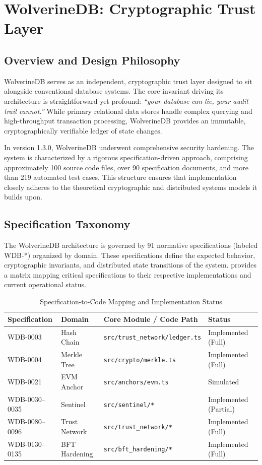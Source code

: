 \chapter{WolverineDB: Cryptographic Trust Layer}\label{ch:wolverinedb}

\section{Overview and Design Philosophy}\label{sec:wdb-overview}
WolverineDB serves as an independent, cryptographic trust layer designed to sit alongside conventional database systems. The core invariant driving its architecture is straightforward yet profound: \textit{``your database can lie, your audit trail cannot.''} While primary relational data stores handle complex querying and high-throughput transaction processing, WolverineDB provides an immutable, cryptographically verifiable ledger of state changes. 

In version 1.3.0, WolverineDB underwent comprehensive security hardening. The system is characterized by a rigorous specification-driven approach, comprising approximately 100 source code files, over 90 specification documents, and more than 219 automated test cases. This structure ensures that implementation closely adheres to the theoretical cryptographic and distributed systems models it builds upon.

\section{Specification Taxonomy}\label{sec:wdb-taxonomy}
The WolverineDB architecture is governed by 91 normative specifications (labeled WDB-*) organized by domain. These specifications define the expected behavior, cryptographic invariants, and distributed state transitions of the system.  provides a matrix mapping critical specifications to their respective implementations and current operational status.

\begin{table}[htbp]
\centering
\caption{Specification-to-Code Mapping and Implementation Status}
\label{tab:wdb-specs}
\begin{tabular}{@{}llll@{}}
\toprule
\textbf{Specification} & \textbf{Domain} & \textbf{Core Module / Code Path} & \textbf{Status} \\ \midrule
WDB-0003 & Hash Chain & \texttt{src/trust\_network/ledger.ts} & Implemented (Full) \\
WDB-0004 & Merkle Tree & \texttt{src/crypto/merkle.ts} & Implemented (Full) \\
WDB-0021 & EVM Anchor & \texttt{src/anchors/evm.ts} & Simulated \\
WDB-0030--0035 & Sentinel & \texttt{src/sentinel/*} & Implemented (Partial) \\
WDB-0080--0096 & Trust Network & \texttt{src/trust\_network/*} & Implemented (Full) \\
WDB-0130--0135 & BFT Hardening & \texttt{src/bft\_hardening/*} & Implemented (Full) \\ \bottomrule
\end{tabular}
\end{table}

